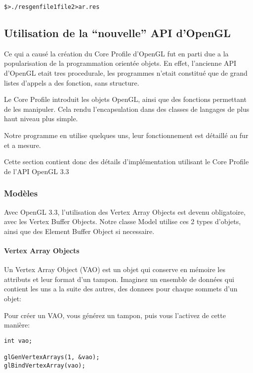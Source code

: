 \documentclass[11pt, a4paper, titlepage]{article}
\begin{document}
\begin{alltt}
\$> ./resgen file1 file2 >  ar.res
\end{alltt}

\subsection{Utilisation de la ``nouvelle'' API d'OpenGL}

Ce qui a causé la création du Core Profile d'OpenGL fut en parti due a la popularisation de la programmation orientée objets.
En effet, l'ancienne API d'OpenGL etait tres procedurale, les programmes n'etait constitué que de grand listes d'appels a des fonction, sans structure.

Le Core Profile introduit les objets OpenGL, ainsi que des fonctions permettant de les manipuler. Cela rendu l'encapsulation dans des classes de langages
de plus haut niveau plus simple.

Notre programme en utilise quelques uns, leur fonctionnement est détaillé au fur et a mesure.

Cette section contient donc des détails d'implémentation utilisant le Core Profile de l'API OpenGL 3.3

\subsubsection{Modèles}

Avec OpenGL 3.3, l'utilisation des Vertex Array Objects est devenu obligatoire, avec les Vertex Buffer Objects.
Notre classe Model utilise ces 2 types d'objets, ainsi que des Element Buffer Object si necessaire.

\paragraph{Vertex Array Objects\\} 

Un Vertex Array Object (VAO) est un objet qui conserve en mémoire les attributs et leur format d'un tampon.
Imaginez un ensemble de données qui contient les uns a la suite des autres, des donnees pour chaque sommets d'un objet:

Pour créer un VAO, vous générez un tampon, puis vous l'activez de cette manière:

\begin{lstlisting}
int vao;

glGenVertexArrays(1, &vao);
glBindVertexArray(vao);
\end{lstlisting}
\end{document}
